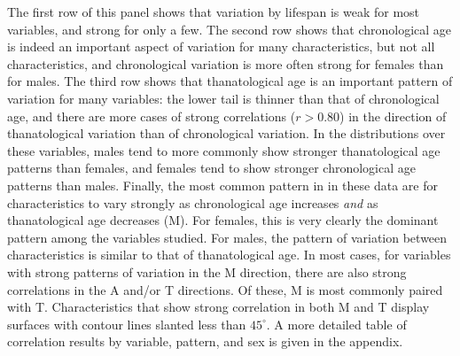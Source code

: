 \documentclass[11pt,oneside]{article} %
\begin{document}
The first row of this panel shows that variation by lifespan is weak for most
variables, and strong for only a few. The second row shows that chronological
age is indeed an important aspect of variation for many characteristics, but not
all characteristics, and chronological variation is more often strong for
females than for males.
The third row shows that thanatological age is an important pattern of variation
for many variables: the lower tail is thinner than that of chronological age,
and there are more cases of strong correlations ($r>0.80$) in the direction of thanatological variation than
of chronological variation. In the distributions over these variables, males tend to
more commonly show stronger thanatological age patterns than females, and
females tend to show stronger chronological age patterns than males. Finally, the most common pattern in in these data are for
characteristics to vary strongly as chronological age increases \textit{and} as
thanatological age decreases (M). For females, this is very clearly the dominant
pattern among the variables studied. For males, the pattern of variation between
characteristics is similar to that of thanatological age. In most cases, for
variables with strong patterns of variation in the M direction, there are also
strong correlations in the A and/or T directions. Of these, M is most commonly
paired with T. Characteristics that show strong correlation in both M and T
display surfaces with contour lines slanted less than $45^\circ$. A more
detailed table of correlation results by variable, pattern, and sex is given in
the appendix.
\end{document}
